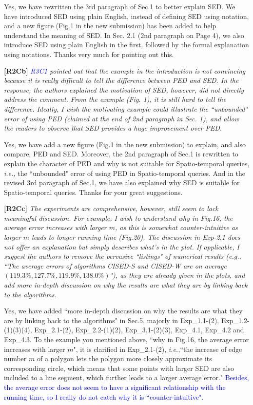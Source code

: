 \documentclass{letter}
\newcommand{\ie}{\emph{i.e.,}\xspace}
\begin{document}
Yes, we have rewritten the 3rd paragraph of Sec.1 to better explain SED. We have introduced SED using plain English, instead of defining SED using notation, and a new figure (Fig.1 in the new submission) has been added to help understand the meaning of SED.
{In Sec. 2.1 (2nd paragraph on Page 4), we also introduce SED using plain English in the first, followed by the formal explanation using notations.}
Thanks very much for pointing out this.


\textbf{[R2Cb]} \emph{\textcolor{blue}{R3C1} pointed out that the example in the introduction is not convincing because it is really difficult to tell the difference between PED and SED. In the response, the authors explained the motivation of SED, however, did not directly address the comment. From the example (Fig. 1), it is still hard to tell the difference. Ideally, I wish the motivating example could illustrate the ``unbounded" error of using PED (claimed at the end of 2nd paragraph in Sec. 1), and allow the readers to observe that SED provides a huge improvement over PED.}

Yes, we have add a new figure (Fig.1 in the new submission) to explain, and also compare, PED and SED. Moreover, the 2nd paragraph of Sec.1 is rewritten to explain the character of PED and why is not suitable for Spatio-temporal queries, \ie the ``unbounded" error of using PED in Spatio-temporal queries. And in the revised 3rd paragraph of Sec.1, we have also explained why SED is suitable for Spatio-temporal queries.
Thanks for your great suggestions.

\textbf{[R2Cc]} \emph{The experiments are comprehensive, however, still seem to lack meaningful discussion. For example, I wish to understand why in Fig.16, the average error increases with larger $m$, as this is somewhat counter-intuitive as larger $m$ leads to longer running time (Fig.20). The discussion in Exp-2.1 does not offer an explanation but simply describes what's in the plot. If applicable, I suggest the authors to remove the pervasive ``listings" of numerical results (e.g., ``The average errors of algorithms CISED-S and CISED-W are on average $(119.3\%, 127.7\%, 119.9\%, 138.0\%)$"), as they are already given in the plots, and add more in-depth discussion on why the results are what they are by linking back to the algorithms. }

Yes, we have added ``more in-depth discussion on why the results are what they are by linking back to the algorithms" in Sec.5, majorly in Exp\_1.1-(2), Exp\_1.2-(1)(3)(4), Exp\_2.1-(2), Exp\_2.2-(1)(2), Exp\_3.1-(2)(3), Exp\_4.1, Exp\_4.2 and Exp\_4.3.
To the example you mentioned above,  ``why in Fig.16, the average error increases with larger $m$", it is clarified in Exp\_2.1-(2), \ie ``the increase of edge number $m$ of a polygon lets the polygon more closely approximate its corresponding circle, which means that some points with larger SED are also included to a line segment, which further leads to a larger average error." \textcolor{blue}{Besides, the average error does not seem to have a significant relationship with the running time, so I really do not catch why it is ``counter-intuitive".}
\end{document}
